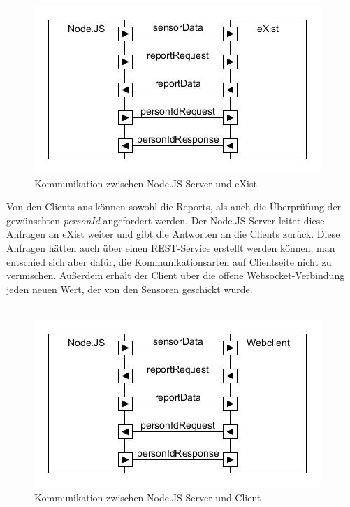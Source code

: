 \begin{figure}[h]
\begin{center}
\includegraphics[scale=0.6]{images/komm2.jpg} 
\caption{Kommunikation zwischen Node.JS-Server und eXist}
\end{center}
\end{figure}

Von den Clients aus können sowohl die Reports, als auch die Überprüfung der gewünschten \textit{personId} angefordert werden. Der Node.JS-Server leitet diese Anfragen an eXist weiter und gibt die Antworten an die Clients zurück. Diese Anfragen hätten auch über einen REST-Service erstellt werden können, man entschied sich aber dafür, die Kommunikationsarten auf Clientseite nicht zu vermischen. Außerdem erhält der Client über die offene Websocket-Verbindung jeden neuen Wert, der von den Sensoren geschickt wurde.  \\ \\

\begin{figure}[h]
\begin{center}
\includegraphics[scale=0.6]{images/komm3.jpg} 
\caption{Kommunikation zwischen Node.JS-Server und Client}
\end{center}
\end{figure}

